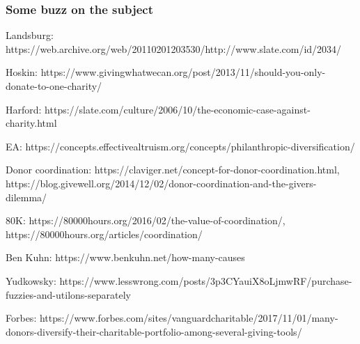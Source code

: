 \documentclass[aspectratio=169]{beamer}
\newenvironment{wideitemize}{\itemize\addtolength{\itemsep}{10pt}}{\enditemize}
\begin{document}
\begin{frame}[fragile] \frametitle{Some buzz on the subject}

		\begin{wideitemize}
			\item Landsburg: https://web.archive.org/web/20110201203530/http://www.slate.com/id/2034/
			\item Hoskin: https://www.givingwhatwecan.org/post/2013/11/should-you-only-donate-to-one-charity/
            \item Harford: https://slate.com/culture/2006/10/the-economic-case-against-charity.html
			\item EA: https://concepts.effectivealtruism.org/concepts/philanthropic-diversification/
            \item Donor coordination: https://claviger.net/concept-for-donor-coordination.html, https://blog.givewell.org/2014/12/02/donor-coordination-and-the-givers-dilemma/
            \item 80K: https://80000hours.org/2016/02/the-value-of-coordination/, https://80000hours.org/articles/coordination/
            \item Ben Kuhn: https://www.benkuhn.net/how-many-causes
            \item Yudkowsky: https://www.lesswrong.com/posts/3p3CYauiX8oLjmwRF/purchase-fuzzies-and-utilons-separately
            \item Forbes: https://www.forbes.com/sites/vanguardcharitable/2017/11/01/many-donors-diversify-their-charitable-portfolio-among-several-giving-tools/
		\end{wideitemize}

\end{frame}
\end{document}
